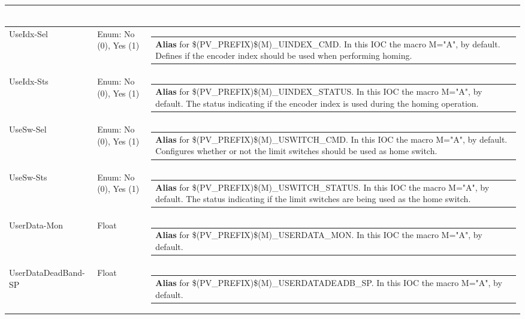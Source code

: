 \documentclass[openany]{article}
\begin{document}
\begin{longtable}{| m{4.5cm} m{2.5cm}  m{8.5cm} |}
\begin{tabular}{@{}m{6cm}@{}}
            \end{tabular} \hypertarget{pv:use-idx}{}\\ \hline
        UseIdx-Sel & Enum: No (0), Yes (1) & \begin{tabular}{@{}m{6cm}@{}}
                \textbf{\color{blue} Alias} for \$(PV\_PREFIX)\$(M)\_UINDEX\_CMD. In this IOC the macro M="A", by default. Defines if the encoder index should be used when performing homing.
            \end{tabular} \hypertarget{}{}\\ \hline
        UseIdx-Sts & Enum: No (0), Yes (1) & \begin{tabular}{@{}m{6cm}@{}}
                \textbf{\color{blue} Alias} for \$(PV\_PREFIX)\$(M)\_UINDEX\_STATUS. In this IOC the macro M="A", by default. The status indicating if the encoder index is used during the homing operation.
            \end{tabular} \hypertarget{pv:use-sw}{}\\ \hline
        UseSw-Sel & Enum: No (0), Yes (1) & \begin{tabular}{@{}m{6cm}@{}}
                \textbf{\color{blue} Alias} for \$(PV\_PREFIX)\$(M)\_USWITCH\_CMD. In this IOC the macro M="A", by default. Configures whether or not the limit switches should be used as home switch.
            \end{tabular} \hypertarget{}{}\\ \hline
        UseSw-Sts & Enum: No (0), Yes (1) & \begin{tabular}{@{}m{6cm}@{}}
                \textbf{\color{blue} Alias} for \$(PV\_PREFIX)\$(M)\_USWITCH\_STATUS. In this IOC the macro M="A", by default. The status indicating if the limit switches are being used as the home switch.
            \end{tabular} \hypertarget{pv:user-data-mon}{}\\ \hline
        UserData-Mon & Float & \begin{tabular}{@{}m{6cm}@{}}
                \textbf{\color{blue} Alias} for \$(PV\_PREFIX)\$(M)\_USERDATA\_MON. In this IOC the macro M="A", by default.
            \end{tabular} \hypertarget{pv:user-data-deadband}{}\\ \hline
        UserDataDeadBand-SP & Float & \begin{tabular}{@{}m{6cm}@{}}
                \textbf{\color{blue} Alias} for \$(PV\_PREFIX)\$(M)\_USERDATADEADB\_SP. In this IOC the macro M="A", by default.

\end{tabular}
\end{longtable}
\end{document}

